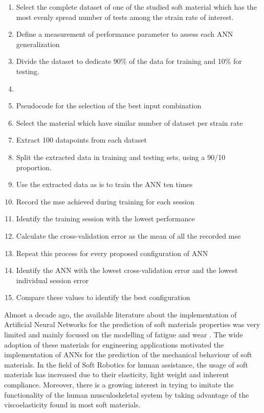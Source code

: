 \begin{enumerate}
    \item Select the complete dataset of one of the studied soft material which has the most evenly spread number of tests among the strain rate of interest.
    \item Define a measurement of performance parameter to assess each ANN generalization
    \item Divide the dataset to dedicate 90\% of the data for training and 10\% for testing.
    \item 
    
    \item Pseudocode for the selection of the best input combination
    \item Select the material which have similar number of dataset per strain rate
    \item Extract 100 datapoints from each dataset
    \item Split the extracted data in training and testing sets, using a 90/10 proportion. 
    \item Use the extracted data as is to train the ANN ten times
    \item Record the mse achieved during training for each session
    \item Identify the training session with the lowest performance
    \item Calculate the cross-validation error as the mean of all the recorded mse
    \item Repeat this process for every proposed configuration of ANN
    \item Identify the ANN with the lowest cross-validation error and the lowest individual session error
    \item Compare these values to identify the best configuration
\end{enumerate}
    


Almost a decade ago, the available literature about the implementation of Artificial Neural Networks for the prediction of soft materials properties was very limited and mainly focused on the modelling of fatigue and wear \cite{zhang2003artificial}. The wide adoption of these materials for engineering applications motivated the implementation of ANNs for the prediction of the mechanical behaviour of soft materials. In the field of Soft Robotics for human assistance, the usage of soft materials has increased due to their elasticity, light weight and inherent compliance. Moreover, there is a growing interest in trying to imitate the functionality of the human musculoskeletal system by taking advantage of the viscoelasticity found in most soft materials.


